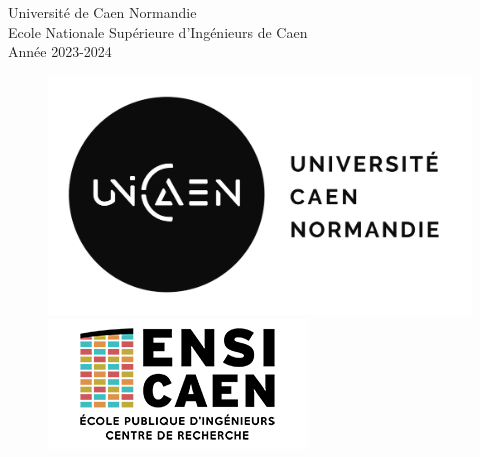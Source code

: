 \documentclass[12pt, a4paper]{article}
\begin{document}
\begin{titlepage}
    \vspace{2cm}
    {\large Université de Caen Normandie \\ Ecole Nationale Supérieure d'Ingénieurs de Caen \\ Année 2023-2024\par}
    \begin{figure}[h!]
        \centering
        \begin{minipage}{0.35\textwidth}
            \centering
             \includegraphics[width=\linewidth]{Images/Others/logo_unicaen.png}
        \end{minipage}
        \hfill %
        \begin{minipage}{0.35\textwidth}
            \centering
            \includegraphics[width=\linewidth]{Images/Others/logo_ensicaen.png}
        \end{minipage}
    \end{figure}
    


\end{titlepage}
\clearpage
\thispagestyle{empty}
\null
\clearpage
\end{document}

